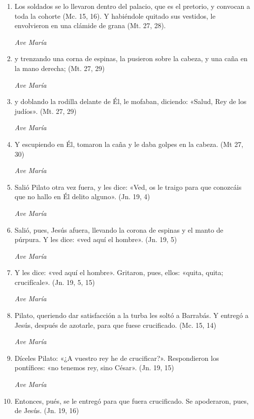 \documentclass[a4paper,11pt, oneside]{report}
\begin{document}
        \begin{enumerate}

          \item Los soldados se lo llevaron dentro del palacio, que es el pretorio, y convocan a toda la cohorte (Mc. 15, 16).
          Y habiéndole quitado sus vestidos, le envolvieron en una clámide de grana (Mt. 27, 28).

          \textit{Ave María}

          \item y trenzando una corna de espinas, la pusieron sobre la cabeza, y una caña en la mano derecha; (Mt. 27, 29)

          \textit{Ave María}

          \item y doblando la rodilla delante de Él, le mofaban, diciendo: «Salud, Rey de los judíos». (Mt. 27, 29)

          \textit{Ave María}

          \item Y escupiendo en Él, tomaron la caña y le daba golpes en la cabeza. (Mt 27, 30)

          \textit{Ave María}

          \item Salió Pilato otra vez fuera, y les dice: «Ved, os le traigo para que conozcáis que no hallo en Él delito alguno». (Jn. 19, 4)

          \textit{Ave María}

          \item Salió, pues, Jesús afuera, llevando la corona de espinas y el manto de púrpura. Y les dice: «ved aquí el hombre». (Jn. 19, 5)

          \textit{Ave María}

          \item Y les dice: «ved aquí el hombre». Gritaron, pues, ellos: «quita, quita; crucifícale». (Jn. 19, 5, 15)

          \textit{Ave María}

          \item Pilato, queriendo dar satisfacción a la turba les soltó a Barrabás. Y entregó a Jesús, después de azotarle, para que fuese crucificado. (Mc. 15, 14)

          \textit{Ave María}

          \item Díceles Pilato: «¿A vuestro rey he de crucificar?». Respondieron los pontífices: «no tenemos rey, sino César». (Jn. 19, 15)

          \textit{Ave María}

          \item Entonces, pués, se le entregó para que fuera crucificado. Se apoderaron, pues, de Jesús. (Jn. 19, 16)

        \end{enumerate}
\end{document}
